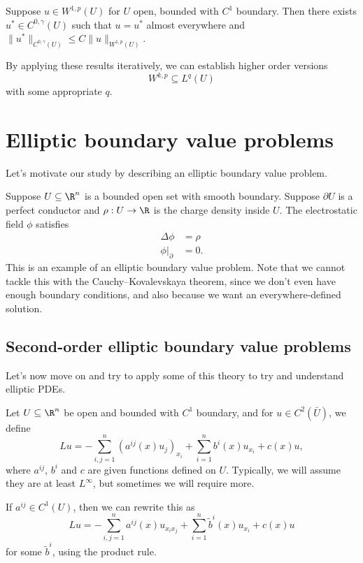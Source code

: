 \documentclass[a4paper]{article}
\begin{document}
\begin{cor}
  Suppose $u \in W^{1, p}(U)$ for $U$ open, bounded with $C^1$ boundary. Then there exists $u^* \in C^{0, \gamma}(U)$ such that $u = u^*$ almost everywhere and $\|u^*\|_{C^{0, \gamma}(U)} \leq C\|u\|_{W^{1, p}(U)}$.
\end{cor}

By applying these results iteratively, we can establish higher order versions
\[
  W^{k, p} \subseteq L^q(U)
\]
with some appropriate $q$.

\section{Elliptic boundary value problems}
Let's motivate our study by describing an elliptic boundary value problem.
\begin{eg}
  Suppose $U \subseteq \R^n$ is a bounded open set with smooth boundary. Suppose $\partial U$ is a perfect conductor and $\rho: U \to \R$ is the charge density inside $U$. The electrostatic field $\phi$ satisfies
  \begin{align*}
    \Delta \phi &= \rho\\
    \phi |_{\partial } &= 0.
  \end{align*}
  This is an example of an elliptic boundary value problem. Note that we cannot tackle this with the Cauchy--Kovalevskaya theorem, since we don't even have enough boundary conditions, and also because we want an everywhere-defined solution.
\end{eg}


\subsection{Second-order elliptic boundary value problems}
Let's now move on and try to apply some of this theory to try and understand elliptic PDEs.

Let $U \subseteq \R^n$ be open and bounded with $C^1$ boundary, and for $u \in C^2(\bar{U})$, we define
\[
  Lu = - \sum_{i, j = 1}^n (a^{ij}(x) u_j)_{x_i} + \sum_{i = 1}^n b^i(x) u_{x_i} + c(x) u,
\]
where $a^{ij}$, $b^i$ and $c$ are given functions defined on $U$. Typically, we will assume they are at least $L^\infty$, but sometimes we will require more.

If $a^{ij} \in C^1(U)$, then we can rewrite this as
\[
  Lu = - \sum_{i, j = 1}^n a^{ij}(x) u_{x_i x_j} + \sum_{i = 1}^n \tilde{b}^i(x) u_{x_i} + c(x) u
\]
for some $\tilde{b}^i$, using the product rule.
\end{document}
